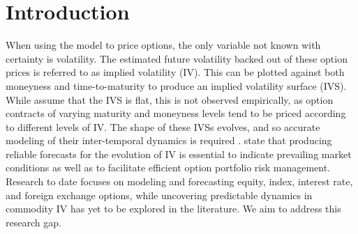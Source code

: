 \documentclass[12pt,a4paper]{article}
\begin{document}
\newpage

\def\spacingset#1{\renewcommand{\baselinestretch}{#1}\small\normalsize} \spacingset{1}
\spacingset{1.45}

\newpage

\section{Introduction}\label{sec:Introduction}

When using the \cite{black1973pricing} model to price options, the only variable not known with certainty is volatility. The estimated future volatility backed out of these option prices is referred to as implied volatility (IV). This can be plotted against both moneyness and time-to-maturity to produce an implied volatility surface (IVS). While \cite{black1973pricing} assume that the IVS is flat, this is not observed empirically, as option contracts of varying maturity and moneyness levels tend to be priced according to different levels of IV. The shape of these IVSs evolves, and so accurate modeling of their inter-temporal dynamics is required \citep{deuskar2008economic, konstantinidi2008can, BH09}. \cite{BH09} state that producing reliable forecasts for the evolution of IV is essential to indicate prevailing market conditions as well as to facilitate efficient option portfolio risk management. Research to date focuses on modeling and forecasting equity, index, interest rate, and foreign exchange options, while uncovering predictable dynamics in commodity IV has yet to be explored in the literature. We aim to address this research gap.
\end{document}
